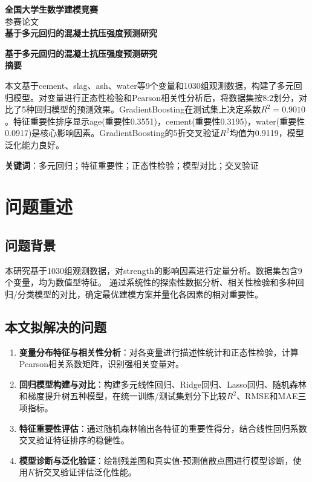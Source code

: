 \documentclass[12pt,a4paper]{ctexart}
\begin{document}
\begin{titlepage}
\vspace*{3cm}
\begin{center}
{\LARGE \textbf{全国大学生数学建模竞赛}}\\[1cm]
{\Large 参赛论文}\\[2cm]
{\huge \textbf{基于多元回归的混凝土抗压强度预测研究}}\\[3cm]
\vfill
\end{center}
\end{titlepage}

\newpage
\begin{center}
{\LARGE \textbf{基于多元回归的混凝土抗压强度预测研究}}\\[0.5cm]
{\large \textbf{摘\quad 要}}
\end{center}
\vspace{0.5cm}
本文基于cement、slag、ash、water等9个变量和1030组观测数据，构建了多元回归模型。对变量进行正态性检验和Pearson相关性分析后，将数据集按8:2划分，对比了5种回归模型的预测效果。GradientBoosting在测试集上决定系数$R^2=0.9010$。特征重要性排序显示age(重要性0.3551)，cement(重要性0.3195)，water(重要性0.0917)是核心影响因素。GradientBoosting的5折交叉验证$R^2$均值为0.9119，模型泛化能力良好。

\vspace{0.5cm}
\noindent\textbf{关键词}：多元回归；特征重要性；正态性检验；模型对比；交叉验证


\newpage
\tableofcontents
\newpage

\section{问题重述}
\subsection{问题背景}
本研究基于1030组观测数据，对strength的影响因素进行定量分析。数据集包含9个变量，均为数值型特征。
通过系统性的探索性数据分析、相关性检验和多种回归/分类模型的对比，确定最优建模方案并量化各因素的相对重要性。
\subsection{本文拟解决的问题}
\begin{enumerate}[label=(\arabic*)]
\item \textbf{变量分布特征与相关性分析}：对各变量进行描述性统计和正态性检验，计算Pearson相关系数矩阵，识别强相关变量对。
\item \textbf{回归模型构建与对比}：构建多元线性回归、Ridge回归、Lasso回归、随机森林和梯度提升树五种模型，在统一训练/测试集划分下比较$R^2$、RMSE和MAE三项指标。
\item \textbf{特征重要性评估}：通过随机森林输出各特征的重要性得分，结合线性回归系数交叉验证特征排序的稳健性。
\item \textbf{模型诊断与泛化验证}：绘制残差图和真实值-预测值散点图进行模型诊断，使用$K$折交叉验证评估泛化性能。
\end{enumerate}
\end{document}

